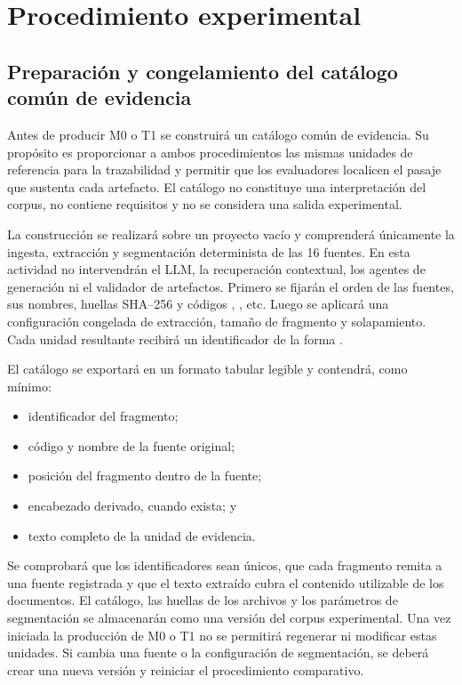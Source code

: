 \section{Procedimiento experimental}

\subsection{Preparación y congelamiento del catálogo común de evidencia}

Antes de producir M0 o T1 se construirá un catálogo común de evidencia. Su propósito es proporcionar a ambos procedimientos las mismas unidades de referencia para la trazabilidad y permitir que los evaluadores localicen el pasaje que sustenta cada artefacto. El catálogo no constituye una interpretación del corpus, no contiene requisitos y no se considera una salida experimental.

La construcción se realizará sobre un proyecto vacío y comprenderá únicamente la ingesta, extracción y segmentación determinista de las 16 fuentes. En esta actividad no intervendrán el LLM, la recuperación contextual, los agentes de generación ni el validador de artefactos. Primero se fijarán el orden de las fuentes, sus nombres, huellas SHA--256 y códigos , , etc. Luego se aplicará una configuración congelada de extracción, tamaño de fragmento y solapamiento. Cada unidad resultante recibirá un identificador de la forma .

El catálogo se exportará en un formato tabular legible y contendrá, como mínimo:

\begin{itemize}
  \item identificador del fragmento;
  \item código y nombre de la fuente original;
  \item posición del fragmento dentro de la fuente;
  \item encabezado derivado, cuando exista; y
  \item texto completo de la unidad de evidencia.
\end{itemize}

Se comprobará que los identificadores sean únicos, que cada fragmento remita a una fuente registrada y que el texto extraído cubra el contenido utilizable de los documentos. El catálogo, las huellas de los archivos y los parámetros de segmentación se almacenarán como una versión del corpus experimental. Una vez iniciada la producción de M0 o T1 no se permitirá regenerar ni modificar estas unidades. Si cambia una fuente o la configuración de segmentación, se deberá crear una nueva versión y reiniciar el procedimiento comparativo.

